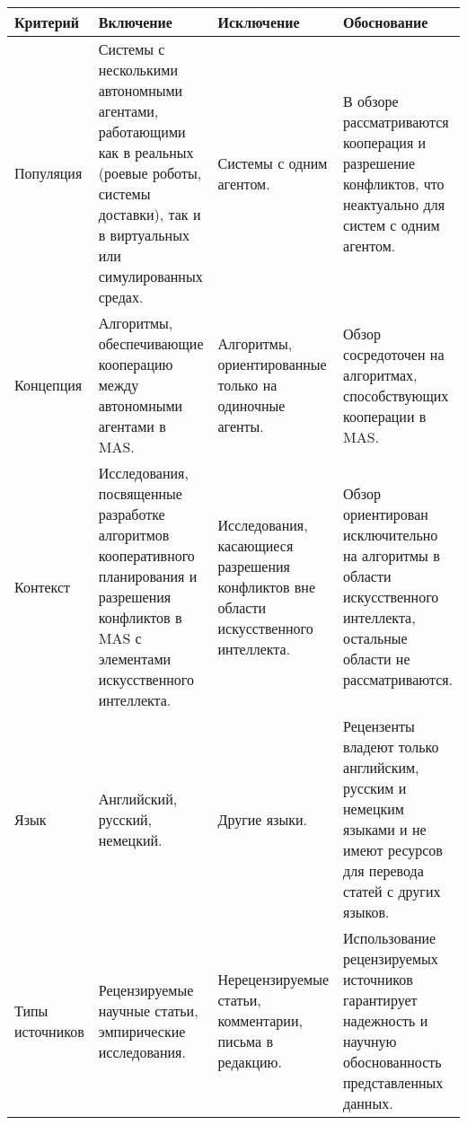 \begin{table}
  \centering
  \begin{footnotesize}
  \caption{Критерии включения/исключения}
  \label{tab:criteria}
  \begin{longtable}{|p{}|p{}|p{}|p{}|}
    \hline
    Критерий & Включение & Исключение & Обоснование\\
    \hline
    \hline
 Популяция        & Системы с несколькими автономными агентами, работающими как в реальных (роевые роботы, системы доставки), так и в виртуальных или симулированных средах. & Системы с одним агентом.                                                              & В обзоре рассматриваются кооперация и разрешение конфликтов, что неактуально для систем с одним агентом.                  \\
    \hline
 Концепция        & Алгоритмы, обеспечивающие кооперацию между автономными агентами в MAS.                                                                                   & Алгоритмы, ориентированные только на одиночные агенты.                                & Обзор сосредоточен на алгоритмах, способствующих кооперации в MAS.                                                        \\
    \hline
 Контекст         & Исследования, посвященные разработке алгоритмов кооперативного планирования и разрешения конфликтов в MAS с элементами искусственного интеллекта.        & Исследования, касающиеся разрешения конфликтов вне области искусственного интеллекта. & Обзор ориентирован исключительно на алгоритмы в области искусственного интеллекта, остальные области не рассматриваются.  \\
    \hline
 Язык             & Английский, русский, немецкий.                                                                                                                           & Другие языки.                                                                         & Рецензенты владеют только английским, русским и немецким языками и не имеют ресурсов для перевода статей с других языков. \\
    \hline
 Типы источников  & Рецензируемые научные статьи, эмпирические исследования.                                                                                                 & Нерецензируемые статьи, комментарии, письма в редакцию.                               & Использование рецензируемых источников гарантирует надежность и научную обоснованность представленных данных.             \\

\end{longtable}
\end{footnotesize}
\end{table}
